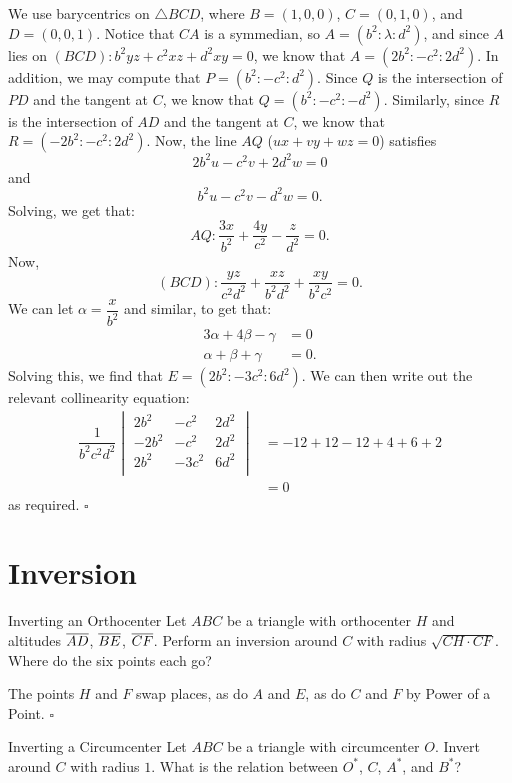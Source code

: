 \documentclass{article}
\begin{document}
We use barycentrics on $\triangle BCD$, where $B = (1, 0, 0)$, $C = (0, 1, 0)$, and $D = (0, 0, 1)$. Notice that $CA$ is a symmedian, so $A = (b^2 : \lambda : d^2)$, and since $A$ lies on $(BCD): b^2yz+c^2xz+d^2xy = 0$, we know that $A = (2b^2 : -c^2 : 2d^2)$. In addition, we may compute that $P = (b^2 : -c^2 : d^2)$. Since $Q$ is the intersection of $PD$ and the tangent at $C$, we know that $Q = (b^2 : -c^2 : -d^2)$. Similarly, since $R$ is the intersection of $AD$ and the tangent at $C$, we know that $R = (-2b^2 : -c^2 : 2d^2)$. Now, the line $AQ$ ($ux+vy+wz = 0$) satisfies \[2b^2u-c^2v+2d^2w = 0\] and \[b^2u-c^2v-d^2w = 0.\] Solving, we get that: \[AQ : \dfrac{3x}{b^2} + \dfrac{4y}{c^2} - \dfrac{z}{d^2} = 0.\] Now, \[(BCD): \dfrac{yz}{c^2d^2}+\dfrac{xz}{b^2d^2}+\dfrac{xy}{b^2c^2} = 0.\] We can let $\alpha = \dfrac{x}{b^2}$ and similar, to get that:
\begin{align*}
3\alpha+4\beta-\gamma &= 0 \\
\alpha+\beta+\gamma &= 0.
\end{align*}
Solving this, we find that $E = (2b^2 : -3c^2 : 6d^2)$. We can then write out the relevant collinearity equation:
\begin{align*}
\dfrac{1}{b^2c^2d^2}\begin{vmatrix}
2b^2&-c^2&2d^2 \\
-2b^2&-c^2&2d^2 \\
2b^2&-3c^2&6d^2 \\
\end{vmatrix}
&= -12+12-12+4+6+2 \\
&= 0
\end{align*}
as required. $\square$
\newpage

\section{Inversion}

\begin{problem}[8.9]{Inverting an Orthocenter}
Let $ABC$ be a triangle with orthocenter $H$ and altitudes $\overline{AD}$, $\overline{BE}$, $\overline{CF}$. Perform an inversion around $C$ with radius $\sqrt{CH \cdot CF}$. Where do the six points each go?
\end{problem}

The points $H$ and $F$ swap places, as do $A$ and $E$, as do $C$ and $F$ by Power of a Point. $\square$

\begin{problem}[8.10]{Inverting a Circumcenter}
Let $ABC$ be a triangle with circumcenter $O$. Invert around $C$ with radius $1$. What is the relation between $O^*$, $C$, $A^*$, and $B^*$?
\end{problem}
\end{document}
